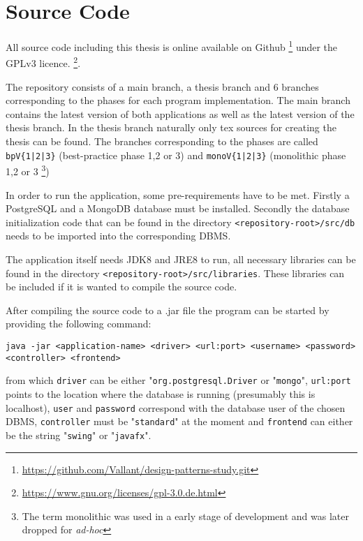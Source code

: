 \chapter{Source Code}
All source code including this thesis is online available on Github \footnote{\href{https://github.com/Vallant/design-patterns-study.git}{https://github.com/Vallant/design-patterns-study.git}} under the GPLv3 licence. \footnote{\href{https://www.gnu.org/licenses/gpl-3.0.de.html}{https://www.gnu.org/licenses/gpl-3.0.de.html}}.

The repository consists of a main branch, a thesis branch and 6 branches corresponding to the phases for each program implementation. The main branch contains the latest version of both applications as well as the latest version of the thesis branch. In the thesis branch naturally only tex sources for creating the thesis can be found. The branches corresponding to the phases are called \texttt{bpV\{1|2|3\}} (best-practice phase 1,2 or 3) and \texttt{monoV\{1|2|3\}} (monolithic phase 1,2 or 3 \footnote{The term monolithic was used in a early stage of development and was later dropped for \emph{ad-hoc}})

In order to run the application, some pre-requirements have to be met. Firstly a PostgreSQL and a MongoDB database must be installed. Secondly the database initialization code that can be found in the directory \texttt{<repository-root>/src/db} needs to be imported into the corresponding DBMS. 

The application itself needs JDK8 and JRE8 to run, all necessary libraries can be found in the directory \texttt{<repository-root>/src/libraries}. These libraries can be included if it is wanted to compile the source code. 

After compiling the source code to a .jar file the program can be started by providing the following command:

\texttt{java -jar <application-name> <driver> <url:port> <username> <password> <controller> <frontend>}

from which \texttt{driver} can be either "\texttt{org.postgresql.Driver} or "\texttt{mongo}", \texttt{url:port} points to the location where the database is running (presumably this is localhost), \texttt{user} and \texttt{password} correspond with the database user of the chosen DBMS, \texttt{controller} must be "\texttt{standard}" at the moment and \texttt{frontend} can either be the string "\texttt{swing}" or "\texttt{javafx}".

